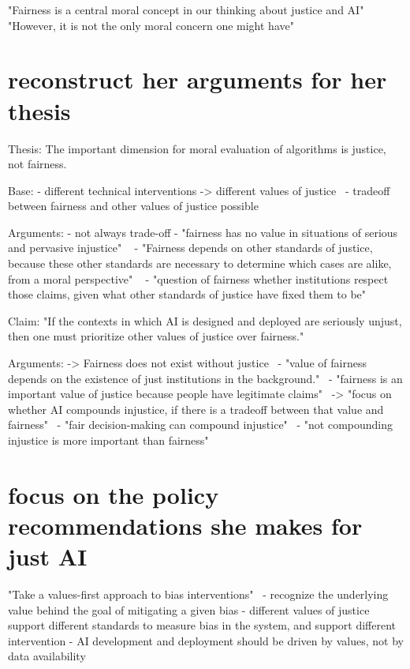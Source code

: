 "Fairness is a central moral concept in our thinking about justice and AI"~\parencite[][13]{vredenburgh}
"However, it is not the only moral concern one might have"~\parencite[][13]{vredenburgh}

\section*{reconstruct her arguments for her thesis}

Thesis: The important dimension for moral evaluation of algorithms is justice, not fairness.


Base:
- different technical interventions -> different values of justice~\parencite[][18]{vredenburgh}
- tradeoff between fairness and other values of justice possible~\parencite[][18]{vredenburgh}

Arguments:
- not always trade-off
  - "fairness has no value in situations of serious and pervasive injustice" ~\parencite[][18]{vredenburgh}
  - "Fairness depends on other standards of justice, because these other standards are necessary to determine which cases are alike, from a moral perspective" ~\parencite[][18]{vredenburgh}
  - "question of fairness whether institutions respect those claims, given what other standards of justice have fixed them to be"~\parencite[][19]{vredenburgh}

Claim: "If the contexts in which AI is designed and deployed are seriously unjust, then one must prioritize other values of justice over fairness."

Arguments:
-> Fairness does not exist without justice~\parencite[][19]{vredenburgh}
  - "value of fairness depends on the existence of just institutions in the background."~\parencite[][19]{vredenburgh}
  - "fairness is an important value of justice because people have legitimate claims"~\parencite[][19]{vredenburgh}
-> "focus on whether AI compounds injustice, if there is a tradeoff between that value and fairness"~\parencite[][20]{vredenburgh}
  - "fair decision-making can compound injustice"~\parencite[][19]{vredenburgh}
  - "not compounding injustice is more important than fairness"~\parencite[][20]{vredenburgh}



\section*{focus on the policy recommendations she makes for just AI}

"Take a values-first approach to bias interventions"~\parencite[][20]{vredenburgh}
- recognize the underlying value behind the goal of mitigating a given bias
- different values of justice support different standards to measure bias in the system, and support different intervention
- AI development and deployment should be driven by values, not by data availability

